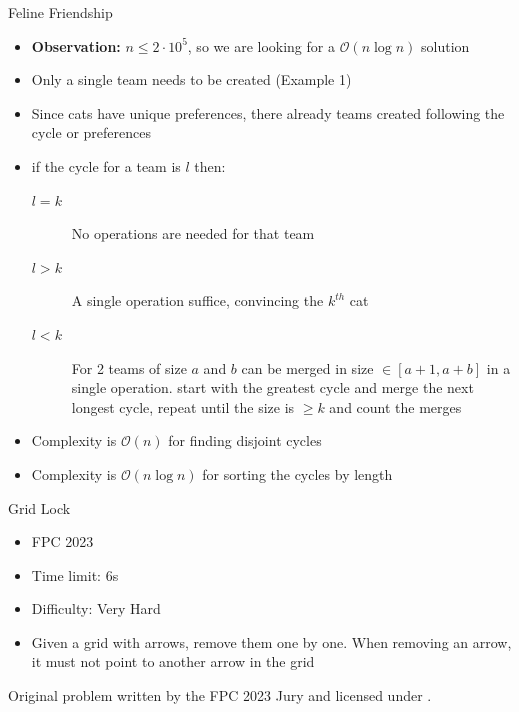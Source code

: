 \documentclass[11pt,pdf, aspectratio=169]{beamer}
\begin{document}
  \begin{frame}{Feline Friendship}
    \begin{itemize}
      \item<1-> \textbf{Observation:} $n \leq 2\cdot 10^5$, so we are looking for a $\mathcal{O}(n \log n)$ solution
      \item<2-> Only a single team needs to be created (Example 1)
      \item<2-> Since cats have unique preferences, there already teams created following the cycle or preferences
      \item<3-> if the cycle for a team is $l$ then:\begin{description}
                                                      \item[$l = k$] No operations are needed for that team
                                                      \item[$l > k$] A single operation suffice, convincing the $k^{th}$ cat
                                                      \item[$l < k$] For 2 teams of size $a$ and $b$ can be merged in size $\in [a+1, a+b]$ in a single operation.
                                                      start with the greatest cycle and merge the next longest cycle, repeat until the size is $\geq k$ and count the merges
      \end{description}
      \item<4-> Complexity is $\mathcal{O}(n)$ for finding disjoint cycles
      \item<4-> Complexity is $\mathcal{O}(n \log n )$ for sorting the cycles by length
    \end{itemize}
  \end{frame}
  \begin{frame}{Grid Lock}
    \begin{itemize}
      \item FPC 2023
      \item Time limit: 6s
      \item Difficulty: Very Hard
      \item Given a grid with arrows, remove them one by one.
      When removing an arrow, it must not point to another arrow in the grid
    \end{itemize}
    Original problem written by the FPC 2023 Jury and licensed under \doclicenseLongNameRef.

    \doclicenseImage

  \end{frame}
\end{document}
